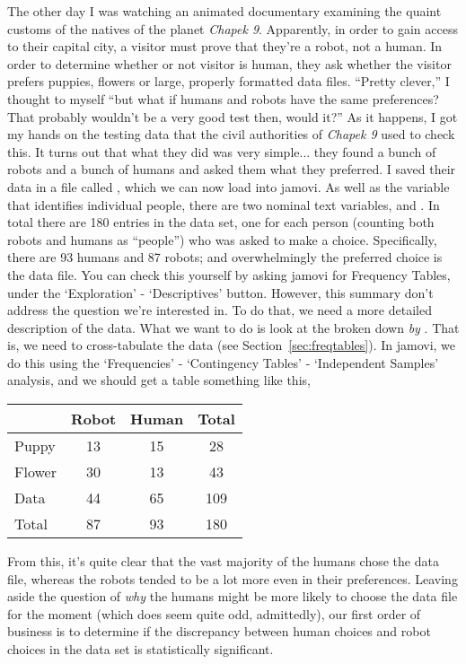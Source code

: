 \noindent
The other day I was watching an animated documentary examining the quaint customs of the natives of the planet {\it Chapek 9}. Apparently, in order to gain access to their capital city, a visitor must prove that they're a robot, not a human. In order to determine whether or not visitor is human, they ask whether the visitor prefers puppies, flowers or large, properly formatted data files. ``Pretty clever,'' I thought to myself ``but what if humans and robots have the same preferences? That probably wouldn't be a very good test then, would it?'' As it happens, I got my hands on the testing data that the civil authorities of {\it Chapek 9} used to check this. It turns out that what they did was very simple... they found a bunch of robots and a bunch of humans and asked them what they preferred. I saved their data in a file called , which we can now load into jamovi. As well as the  variable that identifies individual people, there are two nominal text variables,  and . In total there are 180 entries in the data set, one for each person (counting both robots and humans as ``people'') who was asked to make a choice. Specifically, there are 93 humans and 87 robots; and overwhelmingly the preferred choice is the data file. You can check this yourself by asking jamovi for Frequency Tables, under the `Exploration' - `Descriptives' button. However, this summary don't address the question we're interested in. To do that, we need a more detailed description of the data. What we want to do is look at the  broken down {\it by} . That is, we need to cross-tabulate the data (see Section~\ref{sec:freqtables}). In jamovi, we do this using the `Frequencies' - `Contingency Tables' - `Independent Samples' analysis, and we should get a table something like this,
\begin{center}
\begin{tabular}{l|cc|c}
          & Robot & Human & Total \\ \hline
Puppy     & 13 & 15 & 28 \\ 
Flower    & 30 & 13 & 43 \\
Data      & 44 & 65 & 109 \\ \hline
Total     & 87 & 93 & 180
\end{tabular}
\end{center}

From this, it's quite clear that the vast majority of the humans chose the data file, whereas the robots tended to be a lot  more even in their preferences. Leaving aside the question of {\it why} the humans might be more likely to choose the data file for the moment (which does seem quite odd, admittedly), our first order of business is to determine if the discrepancy between human choices and robot choices in the data set is statistically significant.


